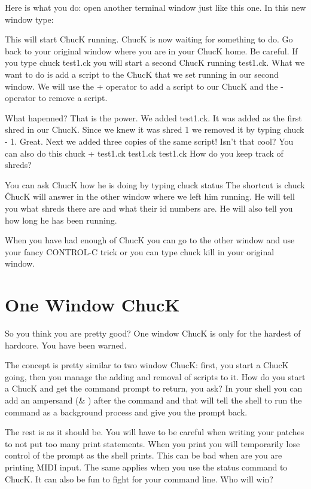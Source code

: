 Here is what you do: open another terminal window just like this one. In this new window type:

This will start ChucK running. ChucK is now waiting for something to do. Go back to your original window where you are in your ChucK home. Be careful. If you type chuck test1.ck you will start a second ChucK running test1.ck. What we want to do is add a script to the ChucK that we set running in our second window. We will use the + operator to add a script to our ChucK and the - operator to remove a script. 


What hapenned? That is the power. We added test1.ck. It was added as the first shred in our ChucK. Since we knew it was shred 1 we removed it by typing chuck - 1. Great. Next we added three copies of the same script! Isn't that cool? You can also do this chuck + test1.ck test1.ck test1.ck How do you keep track of shreds? 

You can ask ChucK how he is doing by typing chuck \doubledash status The shortcut is chuck \^ ChucK will answer in the other window where we left him running. He will tell you what shreds there are and what their id numbers are. He will also tell you how long he has been running. 

When you have had enough of ChucK you can go to the other window and use your fancy CONTROL-C trick or you can type chuck \doubledash kill in your original window.   


\section*{One Window ChucK}

So you think you are pretty good? One window ChucK is only for the hardest of hardcore. You have been warned. 

The concept is pretty similar to two window ChucK: first, you start a ChucK going, then you manage the adding and removal of scripts to it. How do you start a ChucK and get the command prompt to return, you ask? In your shell you can add an ampersand (\& ) after the command and that will tell the shell to run the command as a background process and give you the prompt back. 


The rest is as it should be. You will have to be careful when writing your patches to not put too many print statements. When you print you will temporarily lose control of the prompt as the shell prints. This can be bad when are you are printing MIDI input. The same applies when you use the \doubledash status command to ChucK. It can also be fun to fight for your command line. Who will win?